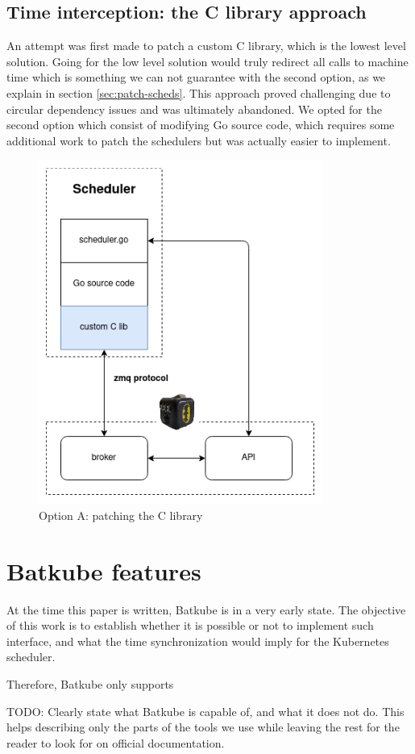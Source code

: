 \subsection{Time interception: the C library approach}

An attempt was first made to patch a custom C library, which is the lowest level
solution. Going for the low level solution would truly redirect all calls to
machine time which is something we can not guarantee with the second option, as
we explain in section \ref{sec:patch-scheds}. This approach proved challenging
due to circular dependency issues and was ultimately abandoned. We opted for
the second option which consist of modifying Go source code, which requires
some additional work to patch the schedulers but was actually easier to
implement.

\begin{figure}
	\centering
	\includegraphics[scale=0.5]{imgs/time-hijack-C.png}
	\caption{Option A: patching the C library}
	\label{fig:patch-C}
\end{figure}

\section{Batkube features}

At the time this paper is written, Batkube is in a very early state. The
objective of this work is to establish whether it is possible or not to
implement such interface, and what the time synchronization would imply for the
Kubernetes scheduler.

Therefore, Batkube only supports 

TODO: Clearly state what Batkube is capable of, and what it does not do. This
helps describing only the parts of the tools we use while leaving the rest for
the reader to look for on official documentation.
